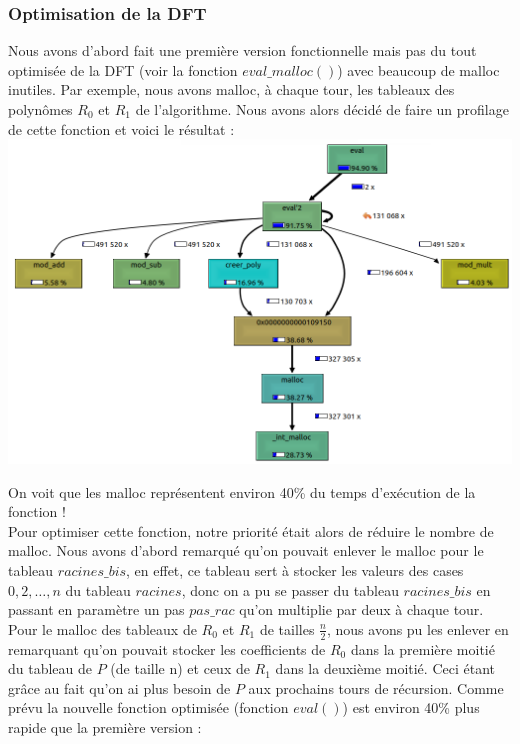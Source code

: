\documentclass[12pt, a4paper]{article}
\begin{document}
\subsubsection{Optimisation de la DFT}
Nous avons d'abord fait une première version fonctionnelle mais pas du tout optimisée de la DFT (voir la fonction $eval\_malloc()$) avec beaucoup de malloc inutiles. Par exemple, nous avons malloc, à chaque tour, les tableaux des polynômes $R_0$ et $R_1$ de l'algorithme. Nous avons alors décidé de faire un profilage de cette fonction et voici le résultat :
\includegraphics[scale=0.8]{profiler_eval_malloc}

On voit que les malloc représentent environ 40\% du temps d'exécution de la fonction ! \\
Pour optimiser cette fonction, notre priorité était alors de réduire le nombre de malloc. Nous avons d'abord remarqué qu'on pouvait enlever le malloc pour le tableau $racines\_bis$, en effet, ce tableau sert à stocker les valeurs des cases $0,2,\dots,n$ du tableau $racines$, donc on a pu se passer du tableau $racines\_bis$ en passant en paramètre un pas $pas\_rac$ qu'on multiplie par deux à chaque tour. \\
Pour le malloc des tableaux de $R_0$ et $R_1$ de tailles $\frac{n}{2}$, nous avons pu les enlever en remarquant qu'on pouvait stocker les coefficients de $R_0$ dans la première moitié du tableau de $P$ (de taille n) et ceux de $R_1$ dans la deuxième moitié. Ceci étant grâce au fait qu'on ai plus besoin de $P$ aux prochains tours de récursion.
Comme prévu la nouvelle fonction optimisée (fonction $eval()$) est environ 40\% plus rapide que la première version :
\end{document}
